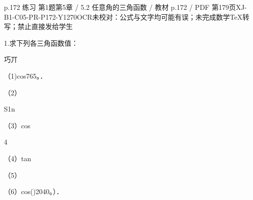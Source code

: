 \begin{bankitem}{p.172 练习 第1题}{第5章 / 5.2 任意角的三角函数 / 教材 p.172 / PDF 第179页}{XJ-B1-C05-PR-P172-Y1270}{OCR未校对：公式与文字均可能有误；未完成数学TeX转写；禁止直接发给学生}
\begin{ocrdraft}
\par
1.求下列各三角函数值：
\par
巧丌
\par
（1)cos765。．
\par
（2）
\par
S1n
\par
（3）cos
\par
4
\par
（4）tan
\par
（5）
\par
（6）cos()2040。）．
\end{ocrdraft}
\end{bankitem}
